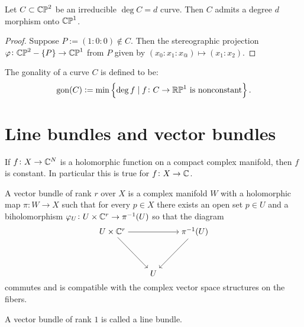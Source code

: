 \documentclass[11pt,a4paper]{article}
\DeclareMathOperator{\gon}{gon}
\begin{document}

\begin{corollary}
  Let $C \subset \mathbb{CP}^2$ be an irreducible $\deg C = d$ curve.
  Then $C$ admits a degree $d$ morphism onto $\mathbb{CP}^1$.
\end{corollary}
\begin{proof}
  Suppose $P := (1 : 0 : 0) \notin C$.
  Then the stereographic projection $\varphi \colon \mathbb{CP}^2 - \left\{P\right\} \to \mathbb{CP}^1$
  from $P$ given by $(x_0 : x_1 : x_@) \mapsto (x_1 : x_2)$.
\end{proof}

\begin{definition}[Gonality]
  The gonality of a curve $C$ is defined to be:
  \[
    \gon(C) :=
    \min\set{\deg f \mid f \colon C \to \RP^1 \text{ is nonconstant}}.
  \]
\end{definition}

\section{Line bundles and vector bundles}

\begin{remark}
  If $f \colon X \to \mathbb{C}^N$ is a holomorphic function on a compact complex
  manifold,
  then $f$ is constant.
  In particular this is true for $f \colon X \to \mathbb{C}$.
\end{remark}


\begin{definition}
  A vector bundle of rank $r$ over $X$ is a complex manifold $W$
  with a holomorphic map $\pi \colon W \to X$ such that
  for every $p \in X$ there exists an open set $p \in U$
  and a biholomorphism $\varphi_U \colon U \times \mathbb{C}^r \to \pi^{-1}(U)$
  so that the diagram
  \[\begin{tikzcd}[ampersand replacement=\&,cramped]
    {U \times \C^r} \&\& {\pi^{-1}(U)} \\
    \\
    \& U
    \arrow[from=1-1, to=1-3]
    \arrow[from=1-1, to=3-2]
    \arrow[from=1-3, to=3-2]
  \end{tikzcd}\]
  commutes and is compatible with the complex vector space structures on the
  fibers.
\end{definition}

\begin{remark}
  A vector bundle of rank $1$ is called a line bundle.
\end{remark}
\end{document}
